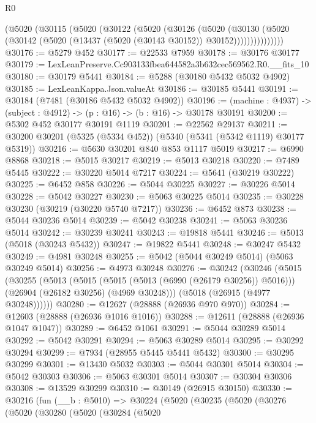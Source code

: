 \begin{lexlean}{R0}
\begin{coremodule}
          (@5020
            (@30115
              (@5020
                (@30122
                  (@5020
                    (@30126
                      (@5020
                        (@30130
                          (@5020
                            (@30142 (@5020 (@13437 (@5020 (@30143 @30152)) @30152)))))))))))))))
@30176 := @5279 @452
@30177 := @22533 @7959
@30178 := @30176 @30177
@30179 := LexLeanPreserve.Cc903133fbea644582a3b632cec569562.R0.__fits_10
@30180 := @30179 @5441
@30184 := @5288 (@30180 @5432 @5032 @4902)
@30185 := LexLeanKappa.Json.valueAt
@30186 := @30185 @5441
@30191 := @30184 (@7481 (@30186 @5432 @5032 @4902))
@30196 := (machine : @4937) -> (subject : @4912) -> (p : @16) -> (b : @16) -> @30178 @30191
@30200 := @5302 @452 @30177 @30191 @1119
@30201 := @22562 @29137
@30211 := @30200 @30201 (@5325 (@5334 @452)) (@5340 (@5341 (@5342 @1119) @30177 @5319))
@30216 := @5630 @30201 @840 @853 @1117 @5019
@30217 := @6990 @8868
@30218 := @5015 @30217
@30219 := @5013 @30218
@30220 := @7489 @5445
@30222 := @30220 @5014 @7217
@30224 := @5641 (@30219 @30222)
@30225 := @6452 @858
@30226 := @5044 @30225
@30227 := @30226 @5014
@30228 := @5042 @30227
@30230 := @5063 @30225 @5014
@30235 := @30228 @30230 (@30219 (@30220 @5740 @7217))
@30236 := @6452 @873
@30238 := @5044 @30236 @5014
@30239 := @5042 @30238
@30241 := @5063 @30236 @5014
@30242 := @30239 @30241
@30243 := @19818 @5441
@30246 := @5013 (@5018 (@30243 @5432))
@30247 := @19822 @5441
@30248 := @30247 @5432
@30249 := @4981 @30248
@30255 := @5042 (@5044 @30249 @5014) (@5063 @30249 @5014)
@30256 := @4973 @30248
@30276 := @30242
    (@30246
      (@5015
        (@30255
          (@5013
            (@5015 (@5015 (@5013 (@6990 (@26179 @30256)) @5016)))
            (@26904 (@26182 @30256) (@4969 @30248)))
          (@5018 (@26915 (@4977 @30248))))))
@30280 := @12627 (@28888 (@26936 @970 @970))
@30284 := @12603 (@28888 (@26936 @1016 @1016))
@30288 := @12611 (@28888 (@26936 @1047 @1047))
@30289 := @6452 @1061
@30291 := @5044 @30289 @5014
@30292 := @5042 @30291
@30294 := @5063 @30289 @5014
@30295 := @30292 @30294
@30299 := @7934 (@28955 @5445 @5441 @5432)
@30300 := @30295 @30299
@30301 := @13430 @5032
@30303 := @5044 @30301 @5014
@30304 := @5042 @30303
@30306 := @5063 @30301 @5014
@30307 := @30304 @30306
@30308 := @13529 @30299
@30310 := @30149 (@26915 @30150)
@30330 := @30216
    (fun (__b : @5010) =>
    @30224
      (@5020
        (@30235
          (@5020
            (@30276
              (@5020
                (@30280
                  (@5020
                    (@30284
                      (@5020

\end{coremodule}
\end{lexlean}
